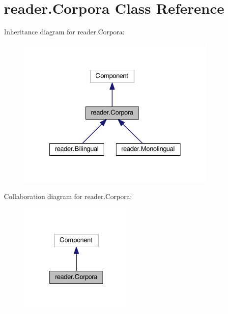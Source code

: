 \hypertarget{classreader_1_1Corpora}{}\section{reader.\+Corpora Class Reference}
\label{classreader_1_1Corpora}


Inheritance diagram for reader.\+Corpora\+:
\nopagebreak
\begin{figure}[H]
\begin{center}
\leavevmode
\includegraphics[width=280pt]{classreader_1_1Corpora__inherit__graph}
\end{center}
\end{figure}


Collaboration diagram for reader.\+Corpora\+:
\nopagebreak
\begin{figure}[H]
\begin{center}
\leavevmode
\includegraphics[width=161pt]{classreader_1_1Corpora__coll__graph}
\end{center}
\end{figure}
